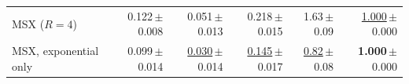 \begin{tabular}{lrrrrr}
\rowcolor{oursbg} \quad MSX ($R=4$) & 0.122{\scriptsize\,$\pm$0.008} & 0.051{\scriptsize\,$\pm$0.013} & 0.218{\scriptsize\,$\pm$0.015} & 1.63{\scriptsize\,$\pm$0.09} & \underline{1.000}{\scriptsize\,$\pm$0.000} \\
\rowcolor{oursbg} \quad MSX, exponential only & 0.099{\scriptsize\,$\pm$0.014} & \underline{0.030}{\scriptsize\,$\pm$0.014} & \underline{0.145}{\scriptsize\,$\pm$0.017} & \underline{0.82}{\scriptsize\,$\pm$0.08} & \textbf{1.000}{\scriptsize\,$\pm$0.000} \\
\bottomrule
\end{tabular}